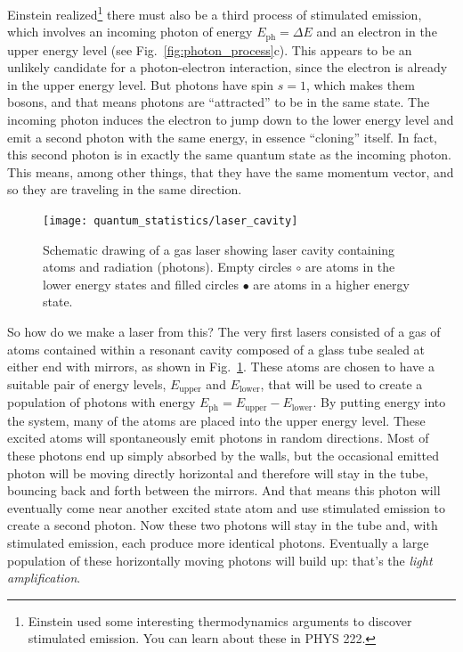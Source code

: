 Einstein realized\footnote{Einstein used some
  interesting thermodynamics arguments to discover stimulated
  emission.  You can learn about these in PHYS 222.}  there must also
be a third process of stimulated emission, which involves an incoming
photon of energy $E_\text{ph} = \Delta E$ and an electron in the upper
energy level (see Fig.~\ref{fig:photon_process}c).  This appears to be
an unlikely candidate for a photon-electron interaction, since the
electron is already in the upper energy level.  But photons have spin
$s=1$, which makes them bosons, and that means photons are
``attracted'' to be in the same state.  The incoming photon induces
the electron to jump down to the lower energy level and emit a second
photon with the same energy, in essence ``cloning'' itself.  In fact,
this second photon is in exactly the same quantum state as the
incoming photon.  This means, among other things, that they have the
same momentum vector, and so they are traveling in the same direction.


\begin{figure}
\begin{center}
\texttt{[image: quantum\_statistics/laser\_cavity]}
\caption{Schematic drawing of a gas laser showing laser cavity
  containing atoms and radiation (photons). Empty circles $\circ$ are
  atoms in the lower energy states and filled circles $\bullet$ are
  atoms in a higher energy state.}
\label{fig:laser_cavity}
\end{center}
\end{figure}

So how do we make a laser from this?  The very first lasers consisted
of a gas of atoms contained within a resonant cavity composed of a
glass tube sealed at either end with mirrors, as shown in
Fig.~\ref{fig:laser_cavity}.  These atoms are chosen to have a
suitable pair of energy levels, $E_\text{upper}$ and $E_\text{lower}$,
that will be used to create a population of photons with energy
$E_\text{ph}=E_\text{upper}-E_\text{lower}$. By putting energy into
the system, many of the atoms are placed into the upper energy level.
These excited atoms will spontaneously emit photons in random
directions.  Most of these photons end up simply absorbed by the
walls, but the occasional emitted photon will be moving directly
horizontal and therefore will stay in the tube, bouncing back and
forth between the mirrors.  And that means this photon will eventually
come near another excited state atom and use stimulated emission to
create a second photon.  Now these two photons will stay in the tube
and, with stimulated emission, each produce more identical photons.
Eventually a large population of these horizontally moving photons
will build up: that's the \textit{light amplification}.


